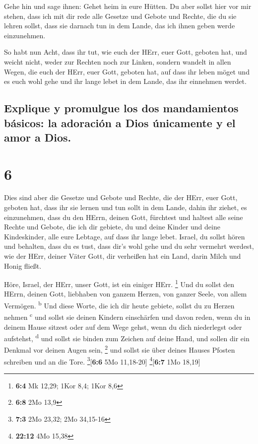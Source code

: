  Gehe hin und sage ihnen: Gehet heim in eure Hütten.
 Du aber sollst hier vor mir stehen, dass ich mit dir
rede alle Gesetze und Gebote und Rechte, die du sie lehren sollst, dass
sie darnach tun in dem Lande, das ich ihnen geben werde einzunehmen.

 So habt nun Acht, dass ihr tut, wie euch der HErr, euer
Gott, geboten hat, und weicht nicht, weder zur Rechten noch zur Linken,
 sondern wandelt in allen Wegen, die euch der HErr, euer
Gott, geboten hat, auf dass ihr leben möget und es euch wohl gehe und
ihr lange lebet in dem Lande, das ihr einnehmen werdet.

\hypertarget{explique-y-promulgue-los-dos-mandamientos-buxe1sicos-la-adoraciuxf3n-a-dios-uxfanicamente-y-el-amor-a-dios.}{%
\subsection{Explique y promulgue los dos mandamientos básicos: la
adoración a Dios únicamente y el amor a
Dios.}\label{explique-y-promulgue-los-dos-mandamientos-buxe1sicos-la-adoraciuxf3n-a-dios-uxfanicamente-y-el-amor-a-dios.}}

\hypertarget{section-5}{%
\section{6}\label{section-5}}

 Dies sind aber die Gesetze und Gebote und Rechte, die der
HErr, euer Gott, geboten hat, dass ihr sie lernen und tun sollt in dem
Lande, dahin ihr ziehet, es einzunehmen,  dass du den
HErrn, deinen Gott, fürchtest und haltest alle seine Rechte und Gebote,
die ich dir gebiete, du und deine Kinder und deine Kindeskinder, alle
eure Lebtage, auf dass ihr lange lebet.  Israel, du sollst
hören und behalten, dass du es tust, dass dir's wohl gehe und du sehr
vermehrt werdest, wie der HErr, deiner Väter Gott, dir verheißen hat ein
Land, darin Milch und Honig fließt.

 Höre, Israel, der HErr, unser Gott, ist ein einiger HErr.
\footnote{\textbf{6:4} Mk 12,29; 1Kor 8,4; 1Kor 8,6}  Und
du sollst den HErrn, deinen Gott, liebhaben von ganzem Herzen, von
ganzer Seele, von allem Vermögen. \textsuperscript{b}  Und
diese Worte, die ich dir heute gebiete, sollst du zu Herzen nehmen
\textsuperscript{c}  und sollst sie deinen Kindern
einschärfen und davon reden, wenn du in deinem Hause sitzest oder auf
dem Wege gehst, wenn du dich niederlegst oder aufstehst,
\textsuperscript{d}  und sollst sie binden zum Zeichen auf
deine Hand, und sollen dir ein Denkmal vor deinen Augen sein,
\footnote{\textbf{6:8} 2Mo 13,9}  und sollst sie über
deines Hauses Pfosten schreiben und an die Tore.
\footnote{\textbf{7:3} 2Mo 23,32; 2Mo 34,15-16}{[}\textbf{6:6} 5Mo
11,18-20{]} \footnote{\textbf{22:12} 4Mo 15,38}{[}\textbf{6:7} 1Mo
18,19{]}

